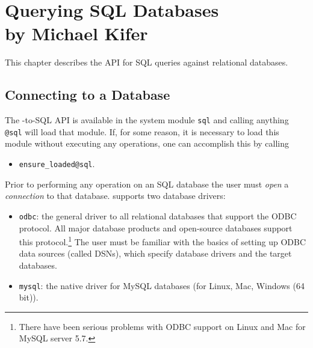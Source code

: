 \chapter[Querying SQL Databases]
{Querying SQL Databases\\
  {\Large by Michael Kifer}}


This chapter describes the API for SQL queries against relational
databases.

\section{Connecting to a Database}

The \ERGO-to-SQL API is available in the system module
\texttt{\bs{}sql}
and calling anything \texttt{@\bs{}sql}  will load that module. If, for
some reason, it is necessary to load this module without executing any
operations, one can accomplish this by calling 
\begin{itemize}
\item  \texttt{ensure\_loaded@\bs{}sql}. 
\end{itemize}

Prior to performing any operation on an SQL database the user must
\emph{open} a \emph{connection} to that database.
\ERGO supports two database drivers:
\begin{itemize}
\item  \texttt{odbc}: the general driver to all relational databases that
  support the ODBC protocol. All major database products and open-source
  databases support this protocol.\footnote{
    There have been serious problems with ODBC support on Linux and Mac for
    MySQL server 5.7.
    }
  The user must be familiar with the
  basics of setting up ODBC data sources (called DSNs),
  which specify database drivers and the target databases.
\item \texttt{mysql}: the native driver for MySQL databases (for Linux,
  Mac, Windows (64 bit)). 
\end{itemize}

